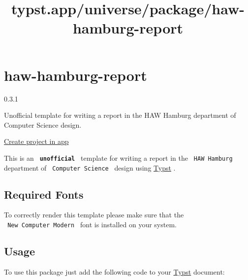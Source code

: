 \title{typst.app/universe/package/haw-hamburg-report}

\label{banner}
\label{template-thumbnail}

\section{haw-hamburg-report}\label{haw-hamburg-report}

{ 0.3.1 }

Unofficial template for writing a report in the HAW Hamburg department
of Computer Science design.

\href{/app?template=haw-hamburg-report&version=0.3.1}{Create project in
app}

\label{readme}
This is an \textbf{\texttt{\ unofficial\ }} template for writing a
report in the \texttt{\ HAW\ Hamburg\ } department of
\texttt{\ Computer\ Science\ } design using
\href{https://github.com/typst/typst}{Typst} .

\subsection{Required Fonts}\label{required-fonts}

To correctly render this template please make sure that the
\texttt{\ New\ Computer\ Modern\ } font is installed on your system.

\subsection{Usage}\label{usage}

To use this package just add the following code to your
\href{https://github.com/typst/typst}{Typst} document:

\begin{Shaded}
\begin{Highlighting}[]

\NormalTok{)}
\end{Highlighting}
\end{Shaded}

